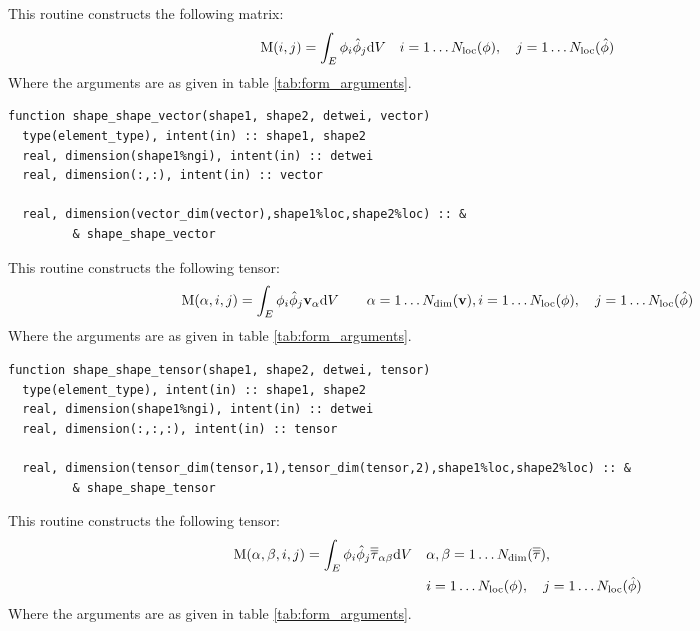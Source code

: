\documentclass[a4paper, 11pt]{book}
\begin{document}
This routine constructs the following matrix:
\begin{equation}
  \mathrm{M}(i,j)=\int_E \phi_{i}\hat{\phi}_{j}\mathrm{d} V\quad
  i=1\ldots N_\mathrm{loc}(\phi),\quad j=1\ldots N_\mathrm{loc}(\hat{\phi}) 
\end{equation}
Where the arguments are as given in table \ref{tab:form_arguments}.


\begin{lstlisting}
function shape_shape_vector(shape1, shape2, detwei, vector)
  type(element_type), intent(in) :: shape1, shape2
  real, dimension(shape1%ngi), intent(in) :: detwei
  real, dimension(:,:), intent(in) :: vector

  real, dimension(vector_dim(vector),shape1%loc,shape2%loc) :: &
         & shape_shape_vector
\end{lstlisting}

This routine constructs the following tensor:
\begin{equation}
  \mathrm{M}(\alpha,i,j)=\int_E \phi_{i}\hat{\phi}_{j}\mathbf{v}_\alpha\mathrm{d} V\quad
  \quad \alpha=1\ldots N_\mathrm{dim}(\mathbf{v}),i=1\ldots N_\mathrm{loc}(\phi),\quad j=1\ldots N_\mathrm{loc}(\hat{\phi})
\end{equation}
Where the arguments are as given in table \ref{tab:form_arguments}.


\begin{lstlisting}
function shape_shape_tensor(shape1, shape2, detwei, tensor) 
  type(element_type), intent(in) :: shape1, shape2 
  real, dimension(shape1%ngi), intent(in) :: detwei
  real, dimension(:,:,:), intent(in) :: tensor

  real, dimension(tensor_dim(tensor,1),tensor_dim(tensor,2),shape1%loc,shape2%loc) :: &
         & shape_shape_tensor
\end{lstlisting}


This routine constructs the following tensor:
\begin{equation}
  \begin{split}
    \mathrm{M}(\alpha,\beta,i,j)=\int_E \phi_{i}\hat{\phi}_{j}\overline{\overline{\tau}}_{\alpha\beta}\mathrm{d} V\quad
    &\alpha,\beta=1\ldots N_\mathrm{dim}(\overline{\overline{\tau}}),\\
    &i=1\ldots N_\mathrm{loc}(\phi),\quad j=1\ldots N_\mathrm{loc}(\hat{\phi})   
  \end{split}
\end{equation}
Where the arguments are as given in table \ref{tab:form_arguments}.
\end{document}
